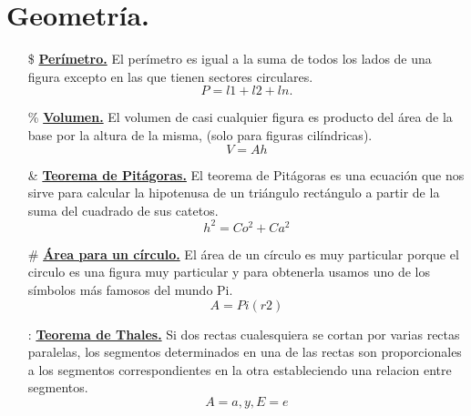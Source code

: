 \documentclass[12pt,letterpaper]{article}
\begin{document}
    \section*{Geometría.}
    \begin{itemize}
        \item[\$] \textbf{\underline{{Perímetro.}}}\newline
        El perímetro es igual a la suma de todos los lados de una figura excepto en las que tienen sectores circulares.
        $$P=l1+l2+ln.$$
        \item[\%] \textbf{\underline{{Volumen.}}}\newline
        El volumen de casi cualquier figura es producto del área de la base por la altura de la misma, (solo para figuras cilíndricas).
        $$V=Ah$$
        \item[\&] \textbf{\underline{Teorema de Pitágoras.}}\newline
        El teorema de Pitágoras es una ecuación que nos sirve para calcular la hipotenusa de un triángulo rectángulo a partir de la suma del cuadrado de sus catetos.
        $$h^{2}=Co^{2}+Ca^{2}$$
        \item[\#] \textbf{\underline{{Área para un círculo.}}}\newline
         El área de un círculo es muy particular porque el circulo es una figura muy particular y para obtenerla usamos uno de los símbolos más famosos del mundo {Pi}.
         $$A={Pi}(r{2})$$
        \item[:] \textbf{\underline{{Teorema de Thales.}}}\newline
        Si dos rectas cualesquiera se cortan por varias rectas paralelas, los segmentos determinados en una de las rectas son proporcionales a los segmentos correspondientes en la otra estableciendo una relacion entre segmentos.
       $$A=a,y,E=e$$
    \end{itemize}
    \newpage
\end{document}

